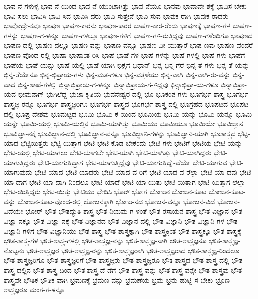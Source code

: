 {ಭಾವ-ನೆ-ಗಳುಳ್ಳ
ಭಾವ-ನೆ-ಯಿಂದ
ಭಾವ-ನೆ-ಯುಂಟಾಗಿತ್ತು
ಭಾವ-ನೆಯೂ
ಭಾವವು
ಭಾವಾವೇ-ಶಕ್ಕೆ
ಭಾವಿಸ-ಬೇಕು
ಭಾವಿ-ಸಲು
ಭಾವಿಸಿ
ಭಾವಿ-ಸಿದ
ಭಾವಿಸಿ-ದರು
ಭಾವಿ-ಸುತ್ತೇನೆ
ಭಾವಿ-ಸುವ
ಭಾವುಕ-ರಾಗಿ
ಭಾವುಕ-ರಾದರು
ಭಾವೋದ್ರೇ-ಕವೂ
ಭಾಷಣ
ಭಾಷಣ-ಕಾರನು
ಭಾಷಣ-ಕಾರರ
ಭಾಷಣ-ಕಾರ-ರೆಂದು
ಭಾಷಣಕ್ಕೆ
ಭಾಷಣ-ಗಳ
ಭಾಷಣ-ಗಳನ್ನು
ಭಾಷಣ-ಗ-ಳನ್ನೂ
ಭಾಷಣ-ಗಳಲ್ಲೂ
ಭಾಷಣ-ಗಳಿಗೆ
ಭಾಷಣ-ಗಳಿ-ರುತ್ತಿದ್ದವು
ಭಾಷಣ-ಗಳೆಂದಿಗೂ
ಭಾಷಣದ
ಭಾಷಣ-ದಲ್ಲಿ
ಭಾಷಣ-ದಲ್ಲೂ
ಭಾಷಣ-ವನ್ನು
ಭಾಷಣ-ವನ್ನೂ
ಭಾಷಣ-ವೀ-ಯುತ್ತಾರೆ
ಭಾಷ-ಣವು
ಭಾಷಣ-ವೆಂದರೆ
ಭಾಷಣ-ವೊಂದ-ರಲ್ಲಿ
ಭಾಷಾ
ಭಾಷಾಂತ-ರಿಸಿ
ಭಾಷೆ
ಭಾಷೆ-ಗಳ
ಭಾಷೆ-ಗಳನ್ನು
ಭಾಷೆ-ಗಳಲ್ಲಿ
ಭಾಷೆ-ಗಳು
ಭಾಷೆಗೆ
ಭಾಷೆಯ
ಭಾಷೆ-ಯನ್ನು
ಭಾಷೆ-ಯಲ್ಲಿ
ಭಾಷೆ-ಯಾಗಿ
ಭಿಕ್ಷೆಗೆ
ಭಿಧಾನ್
ಭಿನ್ನ
ಭಿನ್ನ-ಗೆರೆ
ಭಿನ್ನ-ತೆ-ಗಳು
ಭಿನ್ನ-ತೆ-ಯನ್ನು
ಭಿನ್ನ-ತೆಯೇನೂ
ಭಿನ್ನ-ಭಿಪ್ರಾಯ-ಗಳು
ಭಿನ್ನ-ಮತ-ಗಳೂ
ಭಿನ್ನ-ವತ್ತಳೆಯು
ಭಿನ್ನ-ವಾಗಿ
ಭಿನ್ನ-ವಾಗಿ-ರು-ವನ್ನು
ಭಿನ್ನ-ವಾದ
ಭಿನ್ನ-ಶಾಖೆ-ಗಳಲ್ಲಿ
ಭಿನ್ನಾಭಿಪ್ರಾಯ-ಗ-ಳನ್ನೂ
ಭಿನ್ನಾಭಿಪ್ರಾಯ-ಗ-ಳಿದ್ದವು
ಭಿನ್ನಾಭಿಪ್ರಾ-ಯ-ಗಳೂ
ಭಿನ್ನಾಭಿಪ್ರಾ-ಯದ
ಭೀಮನಾಗ್
ಭುಗಿಲೆದ್ದ
ಭುಜಾ-ಕೃತಿಯ
ಭುವನೇಶ್ವರ-ದಲ್ಲಿ
ಭೂ
ಭೂಕಂಪ-ಗಳು
ಭೂಗರ್ಭ-ಶಾಸ್ತ್ರ
ಭೂಗರ್ಭ-ಶಾಸ್ತ್ರಜ್ಞ-ರನ್ನೂ
ಭೂಗರ್ಭ-ಶಾಸ್ತ್ರಜ್ಞರಿಗೂ
ಭೂಗರ್ಭ-ಶಾಸ್ತ್ರದ
ಭೂಗರ್ಭ-ಶಾಸ್ತ್ರ-ದಲ್ಲಿ
ಭೂಗ್ರಹದ
ಭೂಪಟದ
ಭೂಪಟ-ದಲ್ಲಿ
ಭೂಪ್ರ-ದೇಶವು
ಭೂಮಟ್ಟದ
ಭೂಮಿ
ಭೂಮಿ-ಕೆ-ಯಿಂದ
ಭೂಮಿಯ
ಭೂಮಿ-ಯನ್ನು
ಭೂಮಿ-ಯನ್ನೂ
ಭೂಮಿ-ಯನ್ನೇ
ಭೂಮಿ-ಯಲ್ಲಿ
ಭೂಮಿ-ಯಲ್ಲಿನ
ಭೂಮಿ-ಯಾಗಿತ್ತು
ಭೂಮಿಯು
ಭೂಮಿಯೂ
ಭೂಮಿಯೇ
ಭೂವಿಜ್ಞಾನ
ಭೂವಿಜ್ಞಾ-ನಕ್ಕೆ
ಭೂವಿಜ್ಞಾನ-ದಲ್ಲಿ
ಭೂವಿಜ್ಞಾನ-ವನ್ನೂ
ಭೂವಿಜ್ಞಾನಿ-ಗಳನ್ನು
ಭೂವಿಜ್ಞಾನಿ-ಯಾಗಿ
ಭೂಶಾಸ್ತ್ರದ
ಭೆಟ್ಟಿ-ಯಾದ
ಭೆಟ್ಟಿಯಿತ್ತರು
ಭೆಟ್ಟಿ-ಯಿತ್ತಾಗ
ಭೇಟಿ
ಭೇಟಿ-ಕೊಡ-ಬೇಕೆಂದು
ಭೇಟಿ-ಗಳು
ಭೇಟಿಗೆ
ಭೇಟಿಯ
ಭೇಟಿ-ಯನ್ನು
ಭೇಟಿ-ಯಲ್ಲಿ
ಭೇಟಿ-ಯಾಗಲು
ಭೇಟಿ-ಯಾಗಲೇ
ಭೇಟಿ-ಯಾಗಿ
ಭೇಟಿ-ಯಾಗಿತ್ತು
ಭೇಟಿ-ಯಾಗಿದ್ದರು
ಭೇಟಿ-ಯಾಗುತ್ತಿದ್ದರು
ಭೇಟಿ-ಯಾಗುತ್ತಿದ್ದಾಗ
ಭೇಟಿ-ಯಾಗುತ್ತಿದ್ದೆವು
ಭೇಟಿ-ಯಾಗುತ್ತಿದ್ದೇ-ವೆಯೇ
ಭೇಟಿ-ಯಾಗುವ
ಭೇಟಿ-ಯಾಗುವುದು
ಭೇಟಿ-ಯಾದ
ಭೇಟಿ-ಯಾದರು
ಭೇಟಿ-ಯಾದ-ವ-ರಿಗೆ
ಭೇಟಿ-ಯಾದ-ವ-ರೆಲ್ಲಾ
ಭೇಟಿ-ಯಾ-ದವು
ಭೇಟಿ-ಯಾ-ದಾಗ
ಭೇಟಿ-ಯಾ-ದಾಗಿ-ನಿಂದಲೂ
ಭೇಟಿ-ಯಾದೆ
ಭೇಟಿ-ಯಾ-ಯಿತು
ಭೇಟಿ-ಯಿತ್ತಾಗ
ಭೇಟಿ-ಯಿತ್ತಾಗ-ಲೆಲ್ಲಾ
ಭೇಟಿ-ಯಿತ್ತಿದ್ದರು
ಭೇಟಿ-ಯಿತ್ತು
ಭೇಟಿಯು
ಭೇದಿಸಿ
ಭೊರ್
ಭೋಗ
ಭೋಜನ
ಭೋಜನ-ಕೂಟ
ಭೋಜನ-ಕೂಟ-ವನ್ನು
ಭೋಜನ-ಕೂಟ-ವೊಂದ-ರಲ್ಲಿ
ಭೋಜನಕ್ಕಾಗಿ
ಭೋಜ-ನದ
ಭೋಜನ-ವನ್ನೂ
ಭೋಜನ-ವಿದೆ
ಭೋಜನ-ವಿದೆಯೇ
ಭೋರ್
ಭೌತ
ಭೌತದ್ಯುತಿ-ಶಾಸ್ತ್ರ
ಭೌತ-ನಿಯಮ-ಗ-ಳಂತೆ
ಭೌತ-ರಸಾಯನ-ಶಾಸ್ತ್ರ
ಭೌತ-ವಿಜ್ಞಾನ
ಭೌತ-ವಿಜ್ಞಾ-ನಕ್ಕೂ
ಭೌತ-ವಿಜ್ಞಾ-ನಕ್ಕೆ
ಭೌತ-ವಿಜ್ಞಾನದ
ಭೌತ-ವಿಜ್ಞಾನ-ದಲ್ಲಿ
ಭೌತ-ವಿಜ್ಞಾನಿ
ಭೌತ-ವಿಜ್ಞಾನಿ-ಗಳ
ಭೌತ-ವಿಜ್ಞಾನಿ-ಗಳಿಗೆ
ಭೌತ-ವಿಜ್ಞಾನಿಯು
ಭೌತ-ಶಾಸ್ತ್ರ
ಭೌತ-ಶಾಸ್ತ್ರಕ್ಕಾಗಿ
ಭೌತ-ಶಾಸ್ತ್ರಕ್ಕಿಂತ
ಭೌತ-ಶಾಸ್ತ್ರಕ್ಕೂ
ಭೌತ-ಶಾಸ್ತ್ರಕ್ಕೆ
ಭೌತ-ಶಾಸ್ತ್ರ-ಗಳ
ಭೌತ-ಶಾಸ್ತ್ರ-ಗಳಲ್ಲಿ
ಭೌತ-ಶಾಸ್ತ್ರಜ್ಞ-ನನ್ನು
ಭೌತ-ಶಾಸ್ತ್ರಜ್ಞ-ನಾಗಿ
ಭೌತ-ಶಾಸ್ತ್ರಜ್ಞನೂ
ಭೌತ-ಶಾಸ್ತ್ರಜ್ಞ-ನೊಬ್ಬನು
ಭೌತ-ಶಾಸ್ತ್ರಜ್ಞರ
ಭೌತ-ಶಾಸ್ತ್ರಜ್ಞ-ರನ್ನು
ಭೌತ-ಶಾಸ್ತ್ರಜ್ಞರಾಗಿ
ಭೌತ-ಶಾಸ್ತ್ರಜ್ಞರಾದ
ಭೌತ-ಶಾಸ್ತ್ರಜ್ಞ-ರಿಂದಲೂ
ಭೌತ-ಶಾಸ್ತ್ರಜ್ಞರಿಗೂ
ಭೌತ-ಶಾಸ್ತ್ರಜ್ಞರಿಗೆ
ಭೌತ-ಶಾಸ್ತ್ರಜ್ಞರು
ಭೌತ-ಶಾಸ್ತ್ರಜ್ಞರೂ
ಭೌತ-ಶಾಸ್ತ್ರದ
ಭೌತ-ಶಾಸ್ತ್ರ-ದಲ್ಲಿ
ಭೌತ-ಶಾಸ್ತ್ರ-ದಲ್ಲಿನ
ಭೌತ-ಶಾಸ್ತ್ರ-ದಿಂದ
ಭೌತ-ಶಾಸ್ತ್ರ-ದೆ-ಡೆಗೆ
ಭೌತ-ಶಾಸ್ತ್ರ-ವನ್ನು
ಭೌತ-ಶಾಸ್ತ್ರ-ವನ್ನೇ
ಭೌತ-ಶಾಸ್ತ್ರವು
ಭೌತ-ಶಾಸ್ತ್ರವೇ
ಭೌತಿಕ
ಭೌತಿಕ-ವಾಗಿ
ಭ್ರಮಣಕ್ಕೆ
ಭ್ರಮಣ-ವನ್ನು
ಭ್ರಮಣೆಯ
ಭ್ರಮೆ
ಭ್ರಮೆ-ಹುಟ್ಟಿ-ಸ-ಬೇಕು
ಭ್ರೂಣ-ಶಾಸ್ತ್ರಜ್ಞರೂ
ಮಂಗ-ಗ-ಳನ್ನೂ
}
